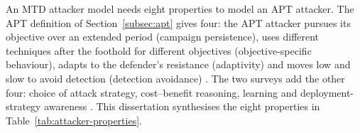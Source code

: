 \documentclass{cshonours}
\begin{document}
An MTD attacker model needs eight properties to model an APT attacker. The APT
definition of Section~\ref{subsec:apt} gives four: the APT attacker
pursues its objective over an extended period (campaign persistence), uses different techniques after the foothold for different objectives (objective-specific behaviour), adapts
to the defender's resistance (adaptivity) and moves low and slow to avoid detection (detection avoidance) \citep{nist2011sp80039, alshamrani2019}. The two
surveys add the other four: choice of attack strategy, cost--benefit reasoning, learning and deployment-strategy awareness \citep{cho2020, jalowski2026}.
This dissertation synthesises the eight properties in
Table~\ref{tab:attacker-properties}.
\end{document}
